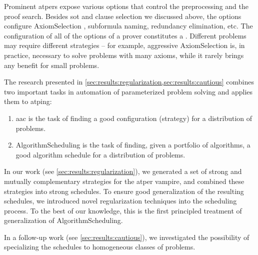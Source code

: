Prominent \glspl{atper} expose various options that control the preprocessing and the proof search.
Besides \gls{sot} and clause selection we discussed above,
the options configure \gls{AxiomSelection} \cite{DBLP:conf/cade/HoderV11}, subformula naming, redundancy elimination, etc.
The configuration of all of the options of a prover constitutes a .
Different problems may require different strategies -- for example, aggressive \gls{AxiomSelection} is, in practice, necessary to solve problems with many axioms, while it rarely brings any benefit for small problems.

The research presented in \cref{sec:results:regularization,sec:results:cautious} combines two important tasks in automation of parameterized problem solving and applies them to \gls{atping}:
\begin{enumerate}
\item \Gls{aac} is the task of finding a good configuration (strategy) for a distribution of problems.
\item \Gls{AlgorithmScheduling} is the task of finding, given a portfolio of algorithms, a good algorithm schedule for a distribution of problems.
\end{enumerate}
In our work \cite{DBLP:conf/ijcar/BartekCS24} (see \cref{sec:results:regularization}), we generated a set of strong and mutually complementary strategies for the \gls{atper} \gls{vampire},
and combined these strategies into strong schedules.
To ensure good generalization of the resulting schedules,
we introduced novel regularization techniques into the scheduling process.
To the best of our knowledge, this is the first principled treatment of generalization of \gls{AlgorithmScheduling}.

In a follow-up work \cite{DBLP:conf/paar/BartekC024} (see \cref{sec:results:cautious}), we investigated the possibility of specializing the schedules to homogeneous classes of problems.

